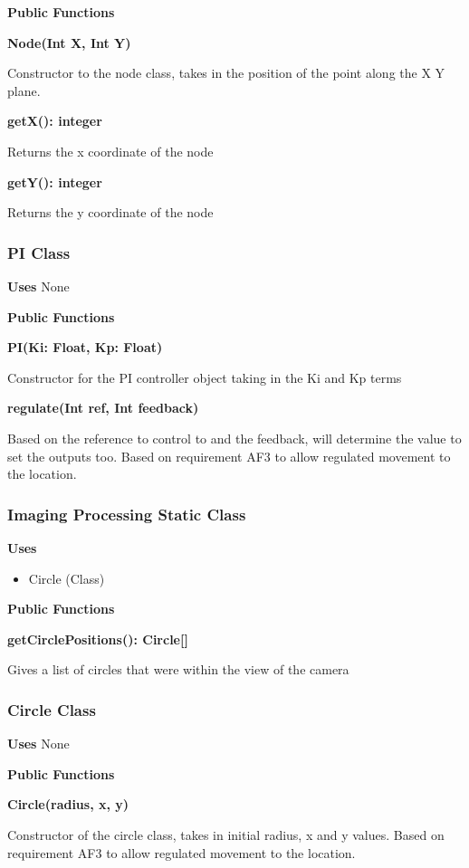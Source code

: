 \documentclass [10pt]{article}
\begin{document}
\textbf{Public Functions}

\textbf{Node(Int X, Int Y)}

Constructor to the node class, takes in the position of the point along the X Y plane.

\textbf{getX(): integer}


Returns the x coordinate of the node

\textbf{getY(): integer}

Returns the y coordinate of the node

\subsubsection{PI Class}
\textbf{Uses}
None 

\textbf{Public Functions}

\textbf{PI(Ki: Float, Kp: Float)}

Constructor for the PI controller object taking in the Ki and Kp terms

\textbf{regulate(Int ref, Int feedback)}

Based on the reference to control to and the feedback, will determine the value to set the outputs too.  Based on requirement AF3 to allow regulated movement to the location.

\subsubsection{Imaging Processing Static Class}
\textbf{Uses}
\begin{itemize}
	\item Circle (Class)
\end{itemize}

\textbf{Public Functions}

\textbf{getCirclePositions(): Circle[]}

Gives a list of circles that were within the view of the camera

\subsubsection{Circle Class}

\textbf{Uses}
None

\textbf{Public Functions}

\textbf{Circle(radius, x, y)}

Constructor of the circle class, takes in initial radius, x and y values. Based on requirement AF3 to allow regulated movement to the location.
\end{document}
